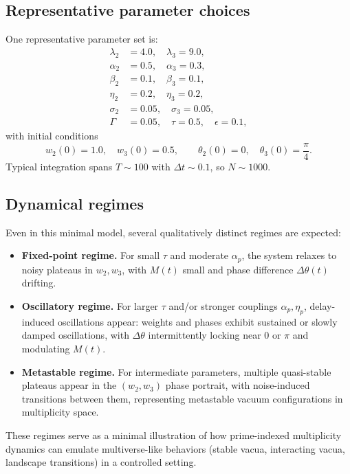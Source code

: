 \documentclass[11pt]{article}
\begin{document}
\subsection{Representative parameter choices}

One representative parameter set is:
\begin{align}
  \lambda_2 &= 4.0, \quad \lambda_3 = 9.0, \\
  \alpha_2 &= 0.5,\quad \alpha_3 = 0.3, \\
  \beta_2 &= 0.1,\quad \beta_3 = 0.1, \\
  \eta_2   &= 0.2,\quad \eta_3 = 0.2, \\
  \sigma_2 &= 0.05,\quad \sigma_3 = 0.05, \\
  \Gamma   &= 0.05,\quad \tau = 0.5,\quad \epsilon = 0.1,
\end{align}
with initial conditions
\begin{equation}
  w_2(0) = 1.0,\quad w_3(0) = 0.5,
  \qquad
  \theta_2(0) = 0,\quad \theta_3(0) = \frac{\pi}{4}.
\end{equation}
Typical integration spans \(T \sim 100\) with \(\Delta t \sim 0.1\), so \(N \sim 1000\).

\subsection{Dynamical regimes}

Even in this minimal model, several qualitatively distinct regimes are expected:
\begin{itemize}
  \item \textbf{Fixed-point regime.}
  For small \(\tau\) and moderate \(\alpha_p\), the system relaxes to noisy plateaus in \(w_2,w_3\), with \(M(t)\) small and phase difference \(\Delta\theta(t)\) drifting.
  \item \textbf{Oscillatory regime.}
  For larger \(\tau\) and/or stronger couplings \(\alpha_p,\eta_p\), delay-induced oscillations appear: weights and phases exhibit sustained or slowly damped oscillations, with \(\Delta\theta\) intermittently locking near \(0\) or \(\pi\) and modulating \(M(t)\).
  \item \textbf{Metastable regime.}
  For intermediate parameters, multiple quasi-stable plateaus appear in the \((w_2,w_3)\) phase portrait, with noise-induced transitions between them, representing metastable vacuum configurations in multiplicity space.
\end{itemize}
These regimes serve as a minimal illustration of how prime-indexed multiplicity dynamics can emulate multiverse-like behaviors (stable vacua, interacting vacua, landscape transitions) in a controlled setting.
\end{document}
